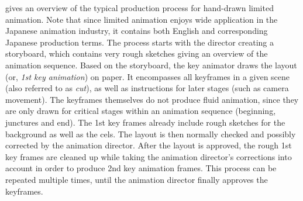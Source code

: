  gives an overview of the typical production process for hand-drawn limited animation. Note that since limited animation enjoys wide application in the Japanese animation industry, it contains both English and corresponding Japanese production terms. The process starts with the director creating a storyboard, which contains very rough sketches giving an overview of the animation sequence. Based on the storyboard, the key animator draws the layout (or, \emph{1st key animation}) on paper. It encompasses all keyframes in a given scene (also referred to as \emph{cut}), as well as instructions for later stages (such as camera movement). The keyframes themselves do not produce fluid animation, since they are only drawn for critical stages within an animation sequence (beginning, junctures and end). The 1st key frames already include rough sketches for the background as well as the cels. The layout is then normally checked and possibly corrected by the animation director. After the layout is approved, the rough 1st key frames are cleaned up while taking the animation director's corrections into account in order to produce 2nd key animation frames. This process can be repeated multiple times, until the animation director finally approves the keyframes.


%             
%             

